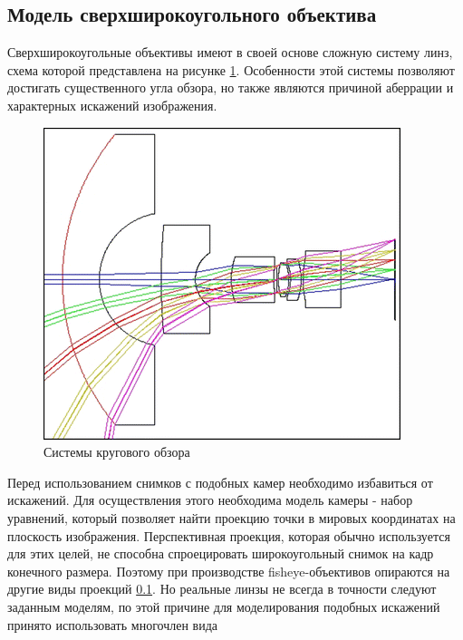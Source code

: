 \subsection{Модель сверхширокоугольного объектива}

Сверхширокоугольные объективы имеют в своей основе сложную систему линз, схема которой представлена на рисунке \ref{pic:fyscheme}. 
Особенности этой системы позволяют достигать существенного угла обзора, но также являются причиной аберрации и характерных искажений 
изображения. 

\begin{figure}[H]
    \begin{center}
        \includegraphics[scale=0.5]{pics/fisheye_scheme.png}                                                                                            %
        \caption{Системы кругового обзора}
        \label{pic:fyscheme}
    \end{center}
\end{figure}
    
Перед использованием снимков с подобных камер необходимо избавиться от искажений. Для осуществления этого необходима модель камеры - 
набор уравнений, который позволяет найти проекцию точки в мировых координатах на плоскость изображения. Перспективная проекция, которая 
обычно используется для этих целей, не способна спроецировать широкоугольный снимок на кадр конечного размера. Поэтому при производстве
 fisheye-объективов опираются на другие виды проекций \ref{}. Но реальные линзы не всегда в точности следуют заданным моделям, по этой 
 причине для моделирования подобных искажений принято использовать многочлен вида

